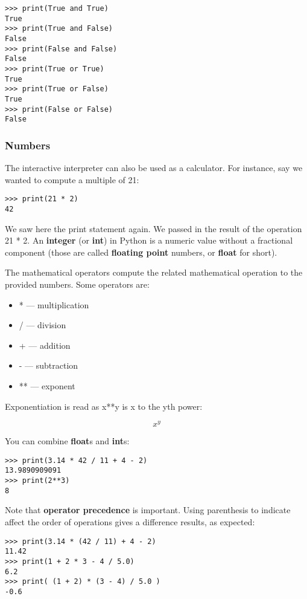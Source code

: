 \begin{verbatim}
>>> print(True and True)
True
>>> print(True and False)
False
>>> print(False and False)
False
>>> print(True or True)
True
>>> print(True or False)
True
>>> print(False or False)
False
\end{verbatim}

\subsubsection{Numbers}\label{numbers}

The interactive interpreter can also be used as a calculator. For
instance, say we wanted to compute a multiple of 21:

\begin{verbatim}
>>> print(21 * 2)
42
\end{verbatim}

We saw here the print statement again. We passed in the result of the
operation 21 * 2. An \textbf{integer} (or \textbf{int}) in Python is a
numeric value without a fractional component (those are called
\textbf{floating point} numbers, or \textbf{float} for short).

The mathematical operators compute the related mathematical operation to
the provided numbers. Some operators are:

\begin{itemize}

\item
  * --- multiplication
\item
  / --- division
\item
  + --- addition
\item
  - --- subtraction
\item
  ** --- exponent
\end{itemize}

Exponentiation is read as x**y is x to the yth power:

\[x^y\]

You can combine \textbf{float}s and \textbf{int}s:

\begin{verbatim}
>>> print(3.14 * 42 / 11 + 4 - 2)
13.9890909091
>>> print(2**3)
8
\end{verbatim}

Note that \textbf{operator precedence} is important. Using parenthesis
to indicate affect the order of operations gives a difference results,
as expected:

\begin{verbatim}
>>> print(3.14 * (42 / 11) + 4 - 2)
11.42
>>> print(1 + 2 * 3 - 4 / 5.0)
6.2
>>> print( (1 + 2) * (3 - 4) / 5.0 )
-0.6
\end{verbatim}

